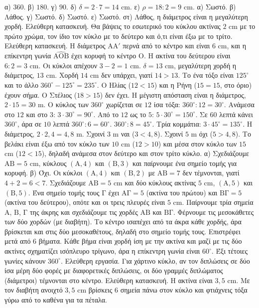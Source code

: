  α) $360$. β) $180$. γ) $90$. δ) $\delta=2\cdot7=14$ cm. ε) $\rho=18:2=9$ cm.
 α) Σωστό. β) Λάθος. γ) Σωστό. δ) Σωστό. ε) Σωστό. στ) Λάθος, η διάμετρος είναι η μεγαλύτερη χορδή.
 Ελεύθερη κατασκευή. Θα βάψεις το εσωτερικό του κύκλου ακτίνας $2$ cm με το πρώτο χρώμα, τον ίδιο τον κύκλο με το δεύτερο και ό,τι είναι έξω με το τρίτο.
 Ελεύθερη κατασκευή. Η διάμετρος $\mathrm{ΑΑ'}$ περνά από το κέντρο και είναι $6$ cm, και η επίκεντρη γωνία $\widehat{\mathrm{ΑΟΒ}}$ έχει κορυφή το κέντρο $\mathrm{Ο}$.
 Η ακτίνα του δεύτερου είναι $6:2=3$ cm. Οι κύκλοι απέχουν $3-2=1$ cm.
 $\delta=13$ cm, μεγαλύτερη χορδή η διάμετρος, $13$ cm. Χορδή $14$ cm δεν υπάρχει, γιατί $14>13$.
 Το ένα τόξο είναι $125^\circ$ και το άλλο $360^\circ-125^\circ=235^\circ$.
 Ο Ηλίας ($12<15$) και η Ρήνη ($15=15$, στο όριο) έχουν σήμα. Ο Στέλιος ($18>15$) δεν έχει. Η μέγιστη απόσταση είναι η διάμετρος, $2\cdot15=30$ m.
 Ο κύκλος των $360^\circ$ χωρίζεται σε $12$ ίσα τόξα: $360^\circ:12=30^\circ$. Ανάμεσα στο $12$ και στο $3$: $3\cdot30^\circ=90^\circ$. Από το $12$ ως το $5$: $5\cdot30^\circ=150^\circ$. Σε $60$ λεπτά κάνει $360^\circ$, άρα σε $10$ λεπτά $360^\circ:6=60^\circ$.
 $360^\circ:8=45^\circ$. Τρία κομμάτια: $3\cdot45^\circ=135^\circ$.
 Η διάμετρος, $2\cdot2{,}4=4{,}8$ m. Σχοινί $3$ m ναι ($3<4{,}8$). Σχοινί $5$ m όχι ($5>4{,}8$).
 Το βελάκι είναι έξω από τον κύκλο των $10$ cm ($12>10$) και μέσα στον κύκλο των $15$ cm ($12<15$), δηλαδή ανάμεσα στον δεύτερο και στον τρίτο κύκλο.
 α) Σχεδιάζουμε $\mathrm{ΑΒ}=5$ cm, κύκλους $(\mathrm{Α},4)$ και $(\mathrm{Β},3)$ και παίρνουμε ένα σημείο τομής για κορυφή. β) Όχι. Οι κύκλοι $(\mathrm{Α},4)$ και $(\mathrm{Β},2)$ με $\mathrm{ΑΒ}=7$ δεν τέμνονται, γιατί $4+2=6<7$.
 Σχεδιάζουμε $\mathrm{ΑΒ}=5$ cm και δύο κύκλους ακτίνας $5$ cm, $(\mathrm{Α},5)$ και $(\mathrm{Β},5)$. Ένα σημείο τομής τους $\mathrm{Γ}$ έχει $\mathrm{ΑΓ}=5$ (ακτίνα του πρώτου) και $\mathrm{ΒΓ}=5$ (ακτίνα του δεύτερου), οπότε και οι τρεις πλευρές είναι $5$ cm.
 Παίρνουμε τρία σημεία $\mathrm{Α}$, $\mathrm{Β}$, $\mathrm{Γ}$ της άκρης και σχεδιάζουμε τις χορδές $\mathrm{ΑΒ}$ και $\mathrm{ΒΓ}$. Φέρνουμε τις μεσοκάθετες των δύο χορδών (με διαβήτη). Το κέντρο ισαπέχει από τα άκρα κάθε χορδής, άρα βρίσκεται και στις δύο μεσοκαθέτους, δηλαδή στο σημείο τομής τους.
 Επιστρέφει μετά από $6$ βήματα. Κάθε βήμα είναι χορδή ίση με την ακτίνα και μαζί με τις δύο ακτίνες σχηματίζει ισόπλευρο τρίγωνο, άρα η επίκεντρη γωνία είναι $60^\circ$. Έξι τέτοιες γωνίες κάνουν $360^\circ$.
 Ελεύθερη εργασία. Για χάρτινο κύκλο, αν τον διπλώσεις σε δύο ίσα μέρη δύο φορές με διαφορετικές διπλώσεις, οι δύο γραμμές διπλώματος (διάμετροι) τέμνονται στο κέντρο.
 Ελεύθερη κατασκευή. Η ακτίνα είναι $3{,}5$ cm. Με τον διαβήτη ανοιχτό $3{,}5$ cm βρίσκεις $6$ σημεία πάνω στον κύκλο και φτιάχνεις τόξα γύρω από το καθένα για τα πέταλα.
